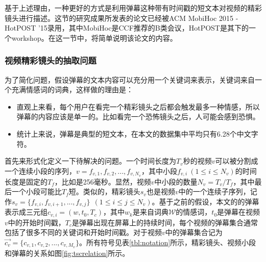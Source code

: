 基于上述理由，一种更好的方式是利用弹幕这种带有时间戳的短文本对视频的精彩镜头进行描述。这节的研究成果所发表的论文已经被ACM MobiHoc 2015 - HotPOST '15录用，其中MobiHoc是CCF推荐的B类会议，HotPOST是其下的一个workshop。在这一节中，将简单说明该论文的内容。

\subsubsection{视频精彩镜头的抽取问题}
为了简化问题，假设弹幕的文本内容可以充分用一个关键词来表示，关键词来自一个充满情感词的词典，这样做的理由是：
\begin{itemize}
  \item 直观上来看，每个用户在看完一个精彩镜头之后都会触发最多一种情感，所以弹幕的内容应该是单一的。比如看完一个恐怖镜头之后，人可能会感到恐惧。
  \item 统计上来说，弹幕是典型的短文本，在本文的数据集中平均只有6.28个中文字符。
\end{itemize}

首先来形式化定义一下待解决的问题。一个时间长度为$T_v$秒的视频$v$可以被分割成一个连续小段的序列，$v={f_{v,1},f_{v,2},...,f_{v,N_v}}$，其中小段$f_{v,i}~(1\le i\le N_v)$的时间长度是固定的$T_f$，比如是256毫秒。显然，视频$v$中小段的数量$N_v=T_v/T_f$，其中最后一个小段可能比$T_f$短。类似的，精彩镜头$s_v$也是视频$v$中的一个连续子序列，记作$s_v=\{f_{v,i}, f_{v,i+1}, ..., f_{v,j}\}~~(1\le i\le j\le N_v)$。基于之前的假设，本文的的弹幕表示成三元组$c_{v,i}=(w, t_0, T_c)$，其中$w_k$是来自词典$\mathcal{W}$的情感词，$t_0$是弹幕在视频$v$中的开始时间戳，$T_c$是弹幕出现在屏幕上的持续时间，每个视频的弹幕集合通常包括了很多不同的关键词和开始时间戳。对于视频$v$中的弹幕集合记为$\vec{c_v}=\{c_{v,1}, c_{v,2},..., c_{v,M_v}\}$。所有符号见表\ref{tbl:notation}所示，精彩镜头、视频小段和弹幕的关系如图\ref{fig:tscrelation}所示。

